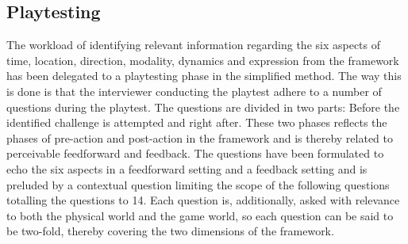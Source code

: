 \subsection{Playtesting}
The workload of identifying relevant information regarding the six aspects of time, location, direction, modality, dynamics and expression from the framework has been delegated to a playtesting phase in the simplified method. The way this is done is that the interviewer conducting the playtest adhere to a number of questions during the playtest. The questions are divided in two parts: Before the identified challenge is attempted and right after. These two phases reflects the phases of pre-action and post-action in the framework and is thereby related to perceivable feedforward and feedback. The questions have been formulated to echo the six aspects in a feedforward setting and a feedback setting and is preluded by a contextual question limiting the scope of the following questions totalling the questions to 14. Each question is, additionally, asked with relevance to both the physical world and the game world, so each question can be said to be two-fold, thereby covering the two dimensions of the framework.

